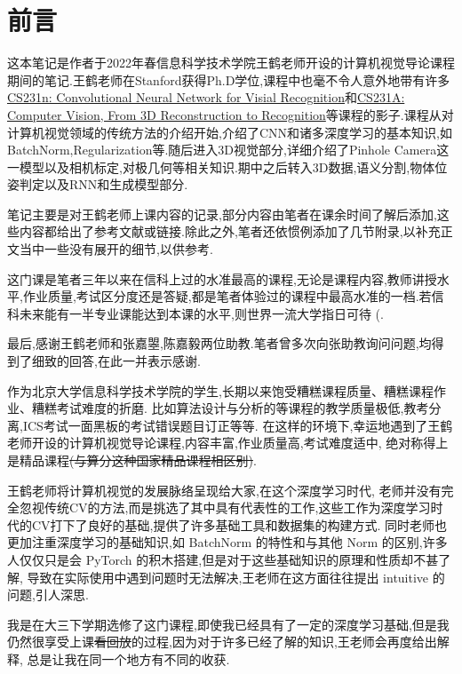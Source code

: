 \section*{前言}

这本笔记是作者于2022年春信息科学技术学院王鹤老师开设的计算机视觉导论课程期间的笔记.王鹤老师在Stanford获得Ph.D学位,课程中也毫不令人意外地带有许多\href{https://cs231n.github.io/}{CS231n: Convolutional Neural Network for Visial Recognition}和\href{https://web.stanford.edu/class/cs231a/course_notes.html}{CS231A: Computer Vision, From 3D Reconstruction to Recognition}等课程的影子.课程从对计算机视觉领域的传统方法的介绍开始,介绍了CNN和诸多深度学习的基本知识,如BatchNorm,Regularization等.随后进入3D视觉部分,详细介绍了Pinhole Camera这一模型以及相机标定,对极几何等相关知识.期中之后转入3D数据,语义分割,物体位姿判定以及RNN和生成模型部分.

笔记主要是对王鹤老师上课内容的记录,部分内容由笔者在课余时间了解后添加,这些内容都给出了参考文献或链接.除此之外,笔者还依惯例添加了几节附录,以补充正文当中一些没有展开的细节,以供参考.

这门课是笔者三年以来在信科上过的水准最高的课程,无论是课程内容,教师讲授水平,作业质量,考试区分度还是答疑,都是笔者体验过的课程中最高水准的一档.若信科未来能有一半专业课能达到本课的水平,则世界一流大学指日可待 (.

最后,感谢王鹤老师和张嘉曌,陈嘉毅两位助教.笔者曾多次向张助教询问问题,均得到了细致的回答,在此一并表示感谢.



作为北京大学信息科学技术学院的学生,长期以来饱受糟糕课程质量、糟糕课程作业、糟糕考试难度的折磨.
比如算法设计与分析的等课程的教学质量极低,教考分离,ICS考试一面黑板的考试错误题目订正等等.
在这样的环境下,幸运地遇到了王鹤老师开设的计算机视觉导论课程,内容丰富,作业质量高,考试难度适中,
绝对称得上是精品课程\sout{(与算分这种国家精品课程相区别)}.

王鹤老师将计算机视觉的发展脉络呈现给大家,在这个深度学习时代,
老师并没有完全忽视传统CV的方法,而是挑选了其中具有代表性的工作,这些工作为深度学习时代的CV打下了良好的基础,提供了许多基础工具和数据集的构建方式.
同时老师也更加注重深度学习的基础知识,如 BatchNorm 的特性和与其他 Norm 的区别,许多人仅仅只是会 PyTorch 的积木搭建,但是对于这些基础知识的原理和性质却不甚了解,
导致在实际使用中遇到问题时无法解决,王老师在这方面往往提出 intuitive 的问题,引人深思.

我是在大三下学期选修了这门课程,即使我已经具有了一定的深度学习基础,但是我仍然很享受上课\sout{看回放}的过程,因为对于许多已经了解的知识,王老师会再度给出解释,
总是让我在同一个地方有不同的收获.

